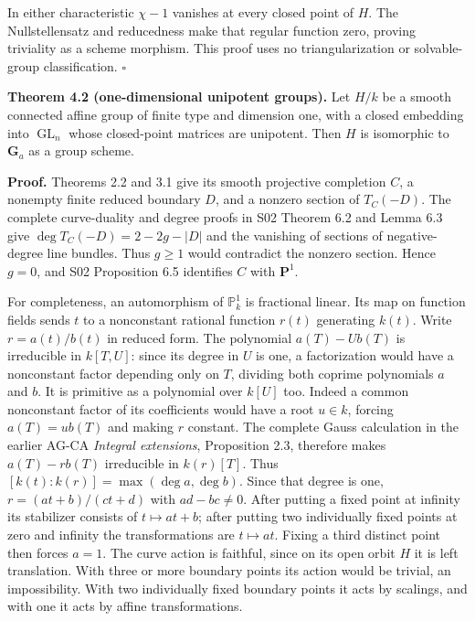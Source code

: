 \documentclass[11pt,a4paper,openany]{report}
\newcounter{none}
\begin{document}
In either characteristic \(\chi-1\) vanishes at every closed point of \(H\). The Nullstellensatz and reducedness make that regular function zero, proving triviality as a scheme morphism. This proof uses no triangularization or solvable-group classification. \(\square\)

\textbf{Theorem 4.2 (one-dimensional unipotent groups).} Let \(H/k\) be a smooth connected affine group of finite type and dimension one, with a closed embedding into \(\operatorname{GL}_n\) whose closed-point matrices are unipotent. Then \(H\) is isomorphic to \(\mathbf G_a\) as a group scheme.

\textbf{Proof.} Theorems 2.2 and 3.1 give its smooth projective completion \(C\), a nonempty finite reduced boundary \(D\), and a nonzero section of \(T_C(-D)\). The complete curve-duality and degree proofs in S02 Theorem 6.2 and Lemma 6.3 give \(\deg T_C(-D)=2-2g-|D|\) and the vanishing of sections of negative-degree line bundles. Thus \(g\ge1\) would contradict the nonzero section. Hence \(g=0\), and S02 Proposition 6.5 identifies \(C\) with \(\mathbf P^1\).

For completeness, an automorphism of \(\mathbb P^1_k\) is fractional linear. Its map on function fields sends \(t\) to a nonconstant rational function \(r(t)\) generating \(k(t)\). Write \(r=a(t)/b(t)\) in reduced form. The polynomial \(a(T)-Ub(T)\) is irreducible in \(k[T,U]\): since its degree in \(U\) is one, a factorization would have a nonconstant factor depending only on \(T\), dividing both coprime polynomials \(a\) and \(b\). It is primitive as a polynomial over \(k[U]\) too. Indeed a common nonconstant factor of its coefficients would have a root \(u\in k\), forcing \(a(T)=u b(T)\) and making \(r\) constant. The complete Gauss calculation in the earlier AG-CA \emph{Integral extensions}, Proposition 2.3, therefore makes \(a(T)-r b(T)\) irreducible in \(k(r)[T]\). Thus \([k(t):k(r)]=\max(\deg a,\deg b)\). Since that degree is one, \(r=(at+b)/(ct+d)\) with \(ad-bc\ne0\). After putting a fixed point at infinity its stabilizer consists of \(t\mapsto at+b\); after putting two individually fixed points at zero and infinity the transformations are \(t\mapsto at\). Fixing a third distinct point then forces \(a=1\). The curve action is faithful, since on its open orbit \(H\) it is left translation. With three or more boundary points its action would be trivial, an impossibility. With two individually fixed boundary points it acts by scalings, and with one it acts by affine transformations.
\end{document}
